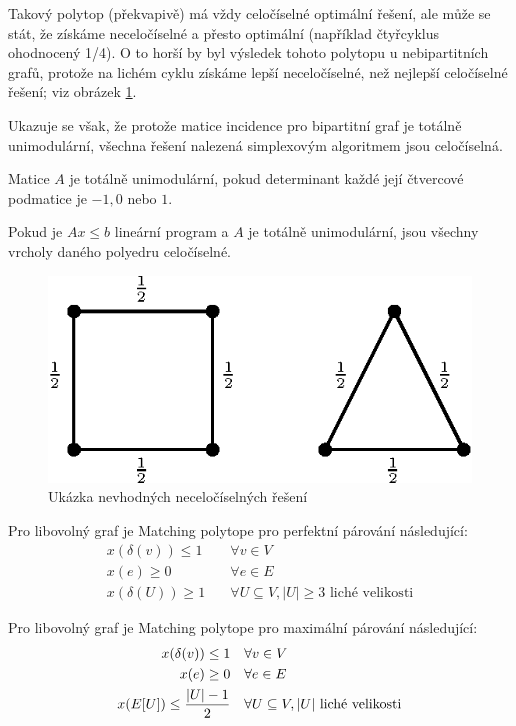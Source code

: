 Takový polytop (překvapivě) má vždy celočíselné optimální řešení, ale může se
stát, že získáme neceločíselné a přesto optimální (například čtyřcyklus
ohodnocený 1/4). O to horší by byl výsledek tohoto polytopu u nebipartitních
grafů, protože na lichém cyklu získáme lepší neceločíselné, než nejlepší
celočíselné řešení; viz obrázek \ref{matching-polytope}.

Ukazuje se však, že protože matice incidence pro bipartitní graf je totálně
unimodulární, všechna řešení nalezená simplexovým algoritmem jsou celočíselná.

\df Matice $A$ je totálně unimodulární, pokud determinant každé její čtvercové
podmatice je $-1, 0$ nebo $1$.

\df Pokud je $Ax \leq b$ lineární program a $A$ je totálně unimodulární, jsou
všechny vrcholy daného polyedru celočíselné.

\begin{figure}[h!]
	\centering
	\includegraphics{img/matching-polytope.eps}
	\caption{Ukázka nevhodných neceločíselných řešení}
	\label{matching-polytope}
\end{figure}

\tv Pro libovolný graf je Matching polytope pro perfektní párování následující:
\begin{align}
	x(\delta(v)) \leq 1  & \quad  \forall v \in V \\
	x(e) \geq 0 & \quad \forall e  \in E \\
	x(\delta(U)) \geq 1 & \quad \forall U \subseteq V, |U| \geq 3 \text{ liché
velikosti}
\end{align}

\tv Pro libovolný graf je Matching polytope pro maximální párování následující:
\begin{align}
	x(\delta(v)) \leq 1  & \quad  \forall v \in V \\
	x(e) \geq 0 & \quad \forall e  \in E \\
	x(E[U]) \leq {|U|-1 \over 2} & \quad \forall U \subseteq V, |U| \text{ liché
velikosti}
\end{align}
